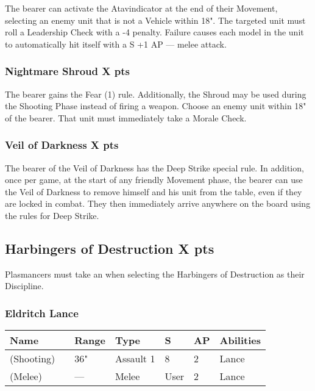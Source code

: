 The bearer can activate the Atavindicator at the end of their Movement, selecting an enemy unit that is not a Vehicle within 18". The targeted unit must roll a Leadership Check with a -4 penalty. Failure causes each model in the unit to automatically hit itself with a S +1 AP — melee attack.

\subsubsection[Nightmare Shroud ]{Nightmare Shroud  \hrulefill X pts} 

The bearer gains the Fear (1) rule. Additionally, the Shroud may be used during the Shooting Phase instead of firing a weapon. Choose an enemy unit within 18" of the bearer. That unit must immediately take a Morale Check.

\subsubsection[Veil of Darkness ]{Veil of Darkness  \hrulefill X pts}

The bearer of the Veil of Darkness has the Deep Strike special rule. In addition, once per game, at the start of any friendly Movement phase, the bearer can use the Veil of Darkness to remove himself and his unit from the table, even if they are locked in combat. They then immediately arrive anywhere on the board using the rules for Deep Strike.



\subsection[Harbingers of Destruction ]{Harbingers of Destruction  \hrulefill X pts}

Plasmancers must take an  when selecting the Harbingers of Destruction as their Discipline.

\subsubsection{Eldritch Lance}
\label{Eldritch Lance}
\noindent
\begin{tabular}{||m{130pt} m{10pt} m{31pt} m{55pt} m{12pt} m{12pt} m{210pt}||}
	\hline
	Name & & Range & Type & S & AP & Abilities \\
	\hline
	\quickref{Eldritch Lance} (Shooting) & & 36" & Assault 1 & 8 & 2 & Lance \\
	\quickref{Eldritch Lance} (Melee) & & — & Melee & User & 2 & Lance \\
	\hline
\end{tabular}

